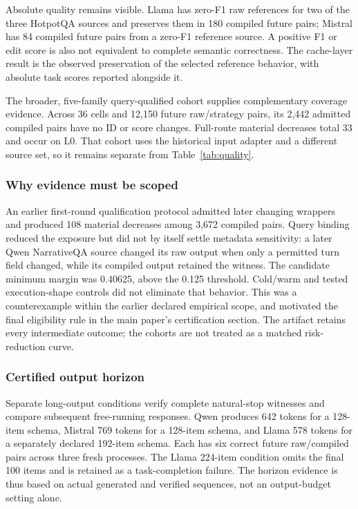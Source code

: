 Absolute quality remains visible. Llama has zero-F1 raw references for two of the three HotpotQA sources and preserves them in 180 compiled future pairs; Mistral has 84 compiled future pairs from a zero-F1 reference source. A positive F1 or edit score is also not equivalent to complete semantic correctness. The cache-layer result is the observed preservation of the selected reference behavior, with absolute task scores reported alongside it.

The broader, five-family query-qualified cohort supplies complementary coverage evidence. Across 36 cells and 12,150 future raw/strategy pairs, its 2,442 admitted compiled pairs have no ID or score changes. Full-route material decreases total 33 and occur on L0. That cohort uses the historical input adapter and a different source set, so it remains separate from Table~\ref{tab:quality}.

\subsubsection{Why evidence must be scoped}
An earlier first-round qualification protocol admitted later changing wrappers and produced 108 material decreases among 3,672 compiled pairs. Query binding reduced the exposure but did not by itself settle metadata sensitivity: a later Qwen NarrativeQA source changed its raw output when only a permitted turn field changed, while its compiled output retained the witness. The candidate minimum margin was 0.40625, above the 0.125 threshold. Cold/warm and tested execution-shape controls did not eliminate that behavior. This was a counterexample within the earlier declared empirical scope, and motivated the final eligibility rule in the main paper's certification section. The artifact retains every intermediate outcome; the cohorts are not treated as a matched risk-reduction curve.

\subsubsection{Certified output horizon}
Separate long-output conditions verify complete natural-stop witnesses and compare subsequent free-running responses. Qwen produces 642 tokens for a 128-item schema, Mistral 769 tokens for a 128-item schema, and Llama 578 tokens for a separately declared 192-item schema. Each has six correct future raw/compiled pairs across three fresh processes. The Llama 224-item condition omits the final 100 items and is retained as a task-completion failure. The horizon evidence is thus based on actual generated and verified sequences, not an output-budget setting alone.

